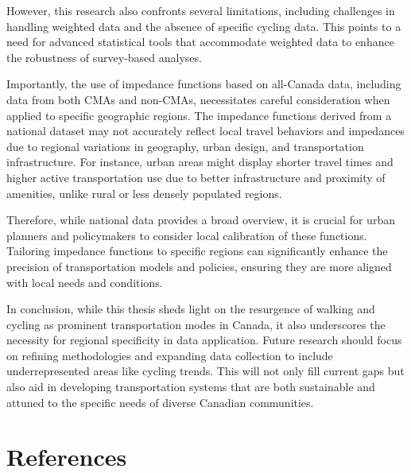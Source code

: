 \documentclass[
11pt, %
oneside, %
english, %
singlespacing, %
]{macthesis} %
\begin{document}
However, this research also confronts several limitations, including challenges in handling weighted data and the absence of specific cycling data. This points to a need for advanced statistical tools that accommodate weighted data to enhance the robustness of survey-based analyses.

Importantly, the use of impedance functions based on all-Canada data, including data from both CMAs and non-CMAs, necessitates careful consideration when applied to specific geographic regions. The impedance functions derived from a national dataset may not accurately reflect local travel behaviors and impedances due to regional variations in geography, urban design, and transportation infrastructure. For instance, urban areas might display shorter travel times and higher active transportation use due to better infrastructure and proximity of amenities, unlike rural or less densely populated regions.

Therefore, while national data provides a broad overview, it is crucial for urban planners and policymakers to consider local calibration of these functions. Tailoring impedance functions to specific regions can significantly enhance the precision of transportation models and policies, ensuring they are more aligned with local needs and conditions.

In conclusion, while this thesis sheds light on the resurgence of walking and cycling as prominent transportation modes in Canada, it also underscores the necessity for regional specificity in data application. Future research should focus on refining methodologies and expanding data collection to include underrepresented areas like cycling trends. This will not only fill current gaps but also aid in developing transportation systems that are both sustainable and attuned to the specific needs of diverse Canadian communities.

\backmatter

\chapter*{References}\label{references}


\noindent

\setlength{\parindent}{-0.20in}
\end{document}

